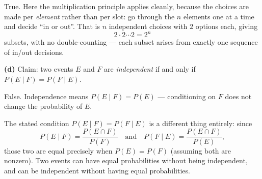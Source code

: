 \documentclass[12pt]{ximera}
\begin{document}
\begin{problem}
\begin{prompt}
\begin{multipleChoice}
\end{multipleChoice}

\begin{feedback}
True. Here the multiplication principle applies cleanly, because the choices are made
per \emph{element} rather than per slot: go through the $n$ elements one at a time and
decide ``in or out''. That is $n$ independent choices with $2$ options each, giving
\[ 2\cdot 2\cdots 2 = 2^n \]
subsets, with no double-counting --- each subset arises from exactly one sequence of
in/out decisions.
\end{feedback}
\end{prompt}

\begin{prompt}
\textbf{(d)} Claim: two events $E$ and $F$ are \emph{independent} if and only if
$P(E\mid F) = P(F\mid E)$.

\begin{multipleChoice}
\end{multipleChoice}

\begin{feedback}
False. Independence means $P(E\mid F)=P(E)$ --- conditioning on $F$ does not change
the probability of $E$.

The stated condition $P(E\mid F)=P(F\mid E)$ is a different thing entirely: since
\[
P(E\mid F)=\frac{P(E\cap F)}{P(F)} \quad\text{and}\quad P(F\mid E)=\frac{P(E\cap F)}{P(E)},
\]
those two are equal precisely when $P(E)=P(F)$ (assuming both are nonzero). Two
events can have equal probabilities without being independent, and can be independent
without having equal probabilities.
\end{feedback}
\end{prompt}
\end{problem}
\end{document}
